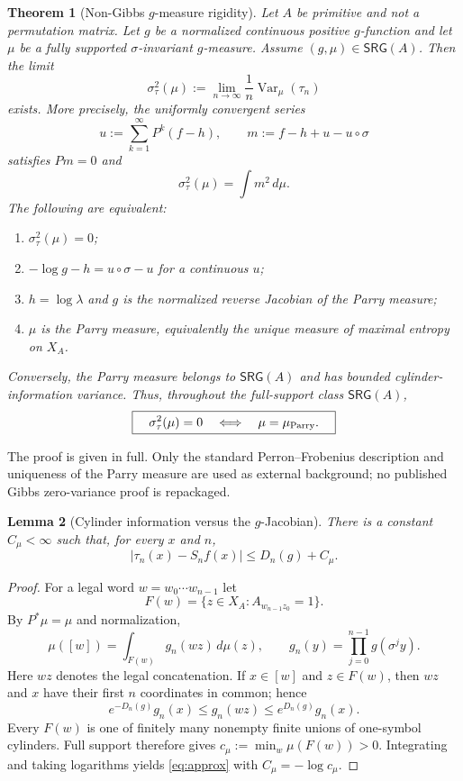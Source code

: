 \documentclass[11pt]{article}
\newtheorem{theorem}{Theorem}
\newtheorem{lemma}[theorem]{Lemma}
\theoremstyle{definition}
\theoremstyle{remark}
\newcommand{\Var}{\operatorname{Var}}
\begin{document}
\begin{theorem}[Non-Gibbs $g$-measure rigidity]\label{thm:main}
Let $A$ be primitive and not a permutation matrix.  Let $g$ be a normalized
continuous positive $g$-function and let $\mu$ be a fully supported
$\sigma$-invariant $g$-measure.  Assume $(g,\mu)\in\mathsf{SRG}(A)$.
Then the limit
\[
 \sigma_\tau^2(\mu):=
 \lim_{n\to\infty}\frac1n\Var_\mu(\tau_n)
\]
exists.  More precisely, the uniformly convergent series
\[
 u:=\sum_{k=1}^{\infty}P^k(f-h),\qquad
 m:=f-h+u-u\circ\sigma
\]
satisfies $Pm=0$ and
\begin{equation}\label{eq:varianceformula}
 \sigma_\tau^2(\mu)=\int m^2\,d\mu.
\end{equation}
The following are equivalent:
\begin{enumerate}
\item $\sigma_\tau^2(\mu)=0$;
\item $-\log g-h=u\circ\sigma-u$ for a continuous $u$;
\item $h=\log\lambda$ and $g$ is the normalized reverse Jacobian of the
      Parry measure;
\item $\mu$ is the Parry measure, equivalently the unique measure of maximal
      entropy on $X_A$.
\end{enumerate}
Conversely, the Parry measure belongs to $\mathsf{SRG}(A)$ and has bounded
cylinder-information variance.  Thus, throughout the full-support class
$\mathsf{SRG}(A)$,
\[
 \boxed{\quad \sigma_\tau^2(\mu)=0
       \quad\Longleftrightarrow\quad
       \mu=\mu_{\rm Parry}.\quad}
\]
\end{theorem}

The proof is given in full.  Only the standard Perron--Frobenius description
and uniqueness of the Parry measure are used as external background; no
published Gibbs zero-variance proof is repackaged.

\begin{lemma}[Cylinder information versus the $g$-Jacobian]\label{lem:cylinder}
There is a constant $C_\mu<\infty$ such that, for every $x$ and $n$,
\begin{equation}\label{eq:approx}
 |\tau_n(x)-S_nf(x)|\le D_n(g)+C_\mu.
\end{equation}
\end{lemma}

\begin{proof}
For a legal word $w=w_0\cdots w_{n-1}$ let
\[
 F(w)=\{z\in X_A:A_{w_{n-1}z_0}=1\}.
\]
By $P^*\mu=\mu$ and normalization,
\begin{equation}\label{eq:disintegration}
 \mu([w])=\int_{F(w)}g_n(wz)\,d\mu(z),\qquad
 g_n(y)=\prod_{j=0}^{n-1}g(\sigma^jy).
\end{equation}
Here $wz$ denotes the legal concatenation.  If $x\in[w]$ and
$z\in F(w)$, then $wz$ and $x$ have their first $n$ coordinates in common;
hence
\[
 e^{-D_n(g)}g_n(x)\le g_n(wz)\le e^{D_n(g)}g_n(x).
\]
Every $F(w)$ is one of finitely many nonempty finite unions of one-symbol
cylinders.  Full support therefore gives
$c_\mu:=\min_w\mu(F(w))>0$.  Integrating and taking logarithms yields
\eqref{eq:approx} with $C_\mu=-\log c_\mu$.
\end{proof}
\end{document}
